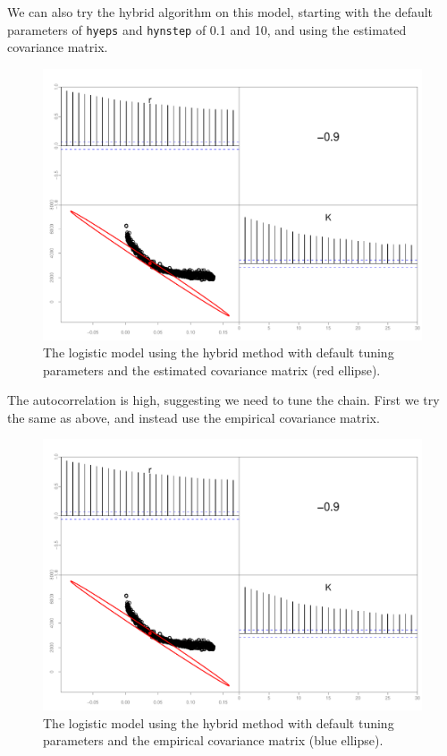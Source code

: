 \documentclass{article}\usepackage[]{graphicx}\usepackage[]{color}
\begin{document}
We can also try the hybrid algorithm on this model, starting
with the default parameters of \texttt{hyeps} and
\texttt{hynstep} of 0.1 and 10, and using the estimated
covariance matrix.
\begin{figure}[H]
  \centering
  \includegraphics[width=5in]{../plots/logistic_hy.pdf}
  \caption{The logistic model using the hybrid method with
    default tuning parameters and the estimated covariance matrix
    (red ellipse).}
  \label{fig:logistic_hy}
\end{figure}
The autocorrelation is high, suggesting we need to tune the
chain. First we try the same as above, and instead use the
empirical covariance matrix.
\begin{figure}[H]
  \centering
  \includegraphics[width=5in]{../plots/logistic_hy.pdf}
  \caption{The logistic model using the hybrid method with
    default tuning parameters and the empirical covariance matrix
    (blue ellipse).}
  \label{fig:logistic_hy2}
\end{figure}
\end{document}
